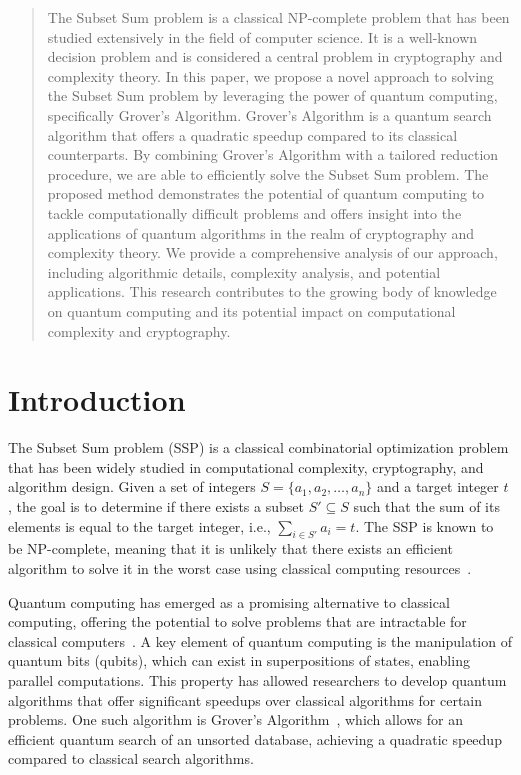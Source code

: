 \begin{abstract}
The Subset Sum problem is a classical NP-complete problem that has been studied extensively in the field of computer science. It is a well-known decision problem and is considered a central problem in cryptography and complexity theory. In this paper, we propose a novel approach to solving the Subset Sum problem by leveraging the power of quantum computing, specifically Grover's Algorithm. Grover's Algorithm is a quantum search algorithm that offers a quadratic speedup compared to its classical counterparts. By combining Grover's Algorithm with a tailored reduction procedure, we are able to efficiently solve the Subset Sum problem. The proposed method demonstrates the potential of quantum computing to tackle computationally difficult problems and offers insight into the applications of quantum algorithms in the realm of cryptography and complexity theory. We provide a comprehensive analysis of our approach, including algorithmic details, complexity analysis, and potential applications. This research contributes to the growing body of knowledge on quantum computing and its potential impact on computational complexity and cryptography.
\end{abstract}

\section{Introduction}

The Subset Sum problem (SSP) is a classical combinatorial optimization problem that has been widely studied in computational complexity, cryptography, and algorithm design. Given a set of integers $S = \{a_1, a_2, \ldots, a_n\}$ and a target integer $t$, the goal is to determine if there exists a subset $S' \subseteq S$ such that the sum of its elements is equal to the target integer, i.e., $\sum_{i \in S'} a_i = t$. The SSP is known to be NP-complete, meaning that it is unlikely that there exists an efficient algorithm to solve it in the worst case using classical computing resources~\cite{garey1979computers}. 

Quantum computing has emerged as a promising alternative to classical computing, offering the potential to solve problems that are intractable for classical computers~\cite{nielsen2002quantum}. A key element of quantum computing is the manipulation of quantum bits (qubits), which can exist in superpositions of states, enabling parallel computations. This property has allowed researchers to develop quantum algorithms that offer significant speedups over classical algorithms for certain problems. One such algorithm is Grover's Algorithm~\cite{grover1996fast}, which allows for an efficient quantum search of an unsorted database, achieving a quadratic speedup compared to classical search algorithms.

